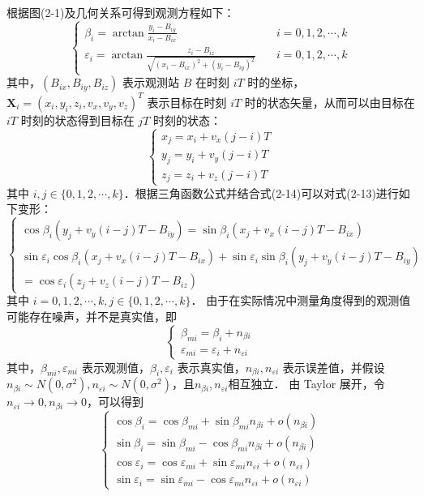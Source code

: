 根据图(2-1)及几何关系可得到观测方程如下：
\begin{equation}
	\begin{cases}
		\beta_i = \arctan \frac{y_i-B_{iy}}{x_i-B_{ix}} &i=0,1,2,\cdots,k \\
		\varepsilon_i = \arctan \frac{z_i-B_{iz}}{\sqrt{(x_i-B_{ix})^2 + (y_i - B_{iy})^2}} \quad &i=0,1,2,\cdots,k
	\end{cases}
\end{equation}
其中，$(B_{ix},B_{iy},B_{iz})$ 表示观测站 $B$ 在时刻 $iT$ 时的坐标，$\bm{X}_i = (x_i,y_i,z_i,v_x,v_y,v_z)^T$ 表示目标在时刻 $iT$ 时的状态矢量，从而可以由目标在 $iT$ 时刻的状态得到目标在 $jT$ 时刻的状态：
\begin{equation}
	\begin{cases}
		x_j = x_i + v_x(j-i)T\\
		y_j = y_i + v_y (j-i)T\\
		z_j = z_i + v_z(j-i)T
	\end{cases}
\end{equation}
其中 $i,j \in \lbrace 0,1,2,\cdots,k \rbrace$．根据三角函数公式并结合式(2-14)可以对式(2-13)进行如下变形：
\begin{equation}
	\begin{cases}
		\cos\beta_i(y_j + v_y(i-j)T-B_{iy}) = \sin\beta_i(x_j+v_x(i-j)T-B_{ix}) \\
		\sin\varepsilon_i \cos\beta_i(x_j+v_x(i-j)T-B_{ix}) + \sin\varepsilon_i \sin\beta_i(y_j + v_y(i-j)T-B_{iy}) \\
		 = \cos\varepsilon_i (z_j + v_z(i-j)T - B_{iz})
	\end{cases}
\end{equation}
其中 $i=0,1,2,\cdots,k,j \in \lbrace 0,1,2,\cdots,k \rbrace$．
由于在实际情况中测量角度得到的观测值可能存在噪声，并不是真实值，即
\begin{equation}
	\begin{cases}
		\beta_{mi} = \beta_i + n_{\beta i} \\
		\varepsilon_{mi} = \varepsilon_i + n_{\varepsilon i}
	\end{cases}
\end{equation}
其中，$\beta_{mi},\varepsilon_{mi}$ 表示观测值，$\beta_i,\varepsilon_i$ 表示真实值，$n_{\beta i},n_{\varepsilon i}$ 表示误差值，并假设 $n_{\beta i} \sim N(0,\sigma^2),n_{\varepsilon i} \sim N(0,\sigma^2)$，且$n_{\beta i},n_{\varepsilon i}$相互独立．
由 Taylor 展开，令$n_{\varepsilon i} \rightarrow 0,n_{\beta i} \rightarrow 0$，可以得到
\begin{equation}
	\begin{cases}
		\cos\beta_i = \cos\beta_{mi} + \sin\beta_{mi}n_{\beta i} + o(n_{\beta i}) \\
		\sin\beta_i = \sin\beta_{mi} - \cos\beta_{mi}n_{\beta i} + o(n_{\beta i}) \\
		\cos\varepsilon_i = \cos\varepsilon_{mi} + \sin\varepsilon_{mi}n_{\varepsilon i} + o(n_{\varepsilon i}) \\
		\sin\varepsilon_i = \sin\varepsilon_{mi} - \cos\varepsilon_{mi}n_{\varepsilon i} + o(n_{\varepsilon i})
	\end{cases}
\end{equation}
